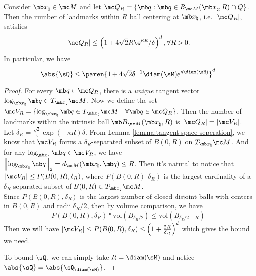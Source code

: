 \begin{lemma}\label{lemma:bound of number of landmarks within R ball}
    Consider $\mb x_\natural \in \mc M$ and let $\mc Q_{R} = \{\mb q: \mb q\in  B_{\mc M}(\mb x_\natural, R) \cap Q\}$. Then the number of landmarks within $R$ ball centering at $\mb x_\natural$, i.e. $|\mc Q_{R}|$, satisfies 
    \begin{equation}
    |\mc Q_{R}| 
    \leq \left( 1 + 4\sqrt{2} R \e^{\kappa R}/ \delta\right)^d, \forall R > 0.
    \end{equation}
    In particular, we have
    \begin{align}\label{eq:app:Q_size_bound}
        \abs{\sQ} \le \paren{1 + 4\sqrt{2}\delta^{-1} \diam(\sM) e^{\kappa \diam(\sM)} }^d 
    \end{align}
\end{lemma}
\begin{proof}
    For every $\mb q \in \mc Q_{R}$, there is a {\em unique} tangent vector $\log_{\mb x_\natural} \mb q \in T_{\mb x_\natural} \mc M$. Now we define the set $\mc V_{R} = \{\log_{\mb x_\natural} \mb q \in T_{\mb x_\natural} \mc M \quad \forall \mb q \in \mc Q_{R}\}$. Then the number of landmarks within the intrinsic ball $\mb B_{\mc M}(\mb x_\natural, R)$ is $|\mc Q_{R}| = |\mc V_{R}|$.
    \vspace{.1in}\\
    Let $\delta_R = \frac{\sqrt{2}}{4}\exp(-\kappa R)\delta$. From Lemma \ref{lemma:tangent space seperation}, we know that $\mc V_{R}$ forms a $\delta_R$-separated subset of $B(0,R)$ on $T_{\mb x_\natural} \mc M$. And for any $\log_{\mb x_\natural}\mb q\in \mc V_{R}$, we have $\left\| \log_{\mb x_\natural}\mb q\right\|_2 = d_{\mc M}(\mb x_\natural, \mb q) \leq R$. Then it's natural to notice that $|\mc V_{R}| \leq P(B(0,R), \delta_R)$, where $P(B(0,R), \delta_R)$ is the largest cardinality of a $\delta_R$-separated subset of $B(0,R) \in T_{\mb x_\natural} \mc M$.
    \vspace{.1in}\\
    Since $P(B(0,R),\delta_R)$ is the largest number of closed disjoint balls with centers in $B(0,R)$ and radii $\delta_R$/2, then by volume comparison, we have
    \begin{equation}
         P(B(0,R),\delta_R) * \text{vol}(B_{\delta_R/2}) \leq \text{vol}(B_{\delta_R/2+R})
    \end{equation}
Then we will have $|\mc V_{R}| \leq P(B(0,R), \delta_R) \leq \left( 1+\frac{2R}{\delta_R}\right)^d$ which gives the bound we need. 

To bound $\sQ$, we can simply take $R = \diam(\sM)$ and notice $\abs{\sQ} =  \abs{\sQ_{\diam(\sM)}}$. 
\end{proof}



